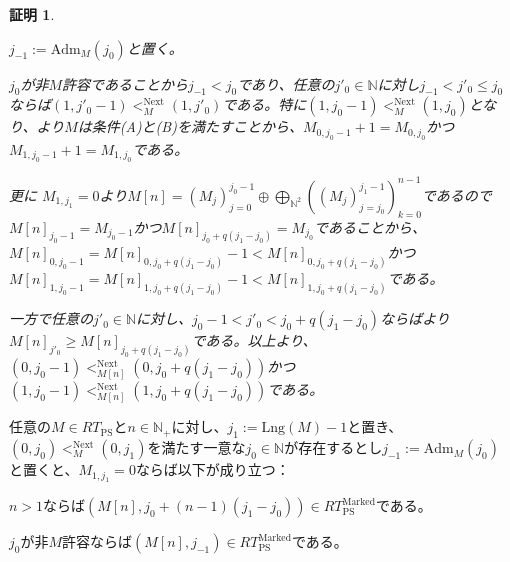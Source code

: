 \documentclass[dvipdfmx,uplatex]{jsarticle}
\theoremstyle{customnonumberbreakfortheorem}
\theoremstyle{customnonumberbreakforproof}
\newtheorem{hideableproof}{証明}
\begin{document}
\begin{hideableproof}
	\begin{indented}
		\item \(j_{-1} := \textrm{Adm}_M(j_0)\)と置く。
		\item \(j_0\)が非\(M\)許容であることから\(j_{-1} < j_0\)であり、任意の\(j'_0 \in \mathbb{N}\)に対し\(j_{-1} < j'_0 \leq j_0\)ならば\((1,j'_0-1) <_M^{\textrm{Next}} (1,j'_0)\)である。特に\((1,j_0-1) <_M^{\textrm{Next}} (1,j_0)\)となり、より\(M\)は条件(A)と(B)を満たすことから、\(M_{0,j_0-1}+1 = M_{0,j_0}\)かつ\(M_{1,j_0-1}+1 = M_{1,j_0}\)である。
		\item 更に \(M_{1,j_1} = 0\)より\(M[n] = (M_j)_{j=0}^{j_0-1} \oplus \bigoplus_{\mathbb{N}^2} ((M_j)_{j=j_0}^{j_1-1})_{k=0}^{n-1}\)であるので\(M[n]_{j_0-1} = M_{j_0-1}\)かつ\(M[n]_{j_0+q(j_1-j_0)} = M_{j_0}\)であることから、\(M[n]_{0,j_0-1} = M[n]_{0,j_0+q(j_1-j_0)}-1 < M[n]_{0,j_0+q(j_1-j_0)}\)かつ\(M[n]_{1,j_0-1} = M[n]_{1,j_0+q(j_1-j_0)}-1 < M[n]_{1,j_0+q(j_1-j_0)}\)である。
		\item 一方で任意の\(j'_0 \in \mathbb{N}\)に対し、\(j_0-1 < j'_0 < j_0+q(j_1-j_0)\)ならばより\(M[n]_{j'_0} \geq M[n]_{j_0+q(j_1-j_0)}\)である。以上より、\((0,j_0-1) <_{M[n]}^{\textrm{Next}} (0,j_0+q(j_1-j_0))\)かつ\((1,j_0-1) <_{M[n]}^{\textrm{Next}} (1,j_0+q(j_1-j_0))\)である。
	\end{indented}
\end{hideableproof}

\begin{lemma}[第\(0\)種型基本列の基本基点関係]\label{第0種型基本列の基本基点関係}
	任意の\(M \in RT_{\textrm{PS}}\)と\(n \in \mathbb{N}_{+}\)に対し、\(j_1 := \textrm{Lng}(M)-1\)と置き、\((0,j_0) <_M^{\textrm{Next}} (0,j_1)\)を満たす一意な\(j_0 \in \mathbb{N}\)が存在するとし\(j_{-1} := \textrm{Adm}_M(j_0)\)と置くと、\(M_{1,j_1} = 0\)ならば以下が成り立つ：
	\begin{penumerate}
		\item \(n > 1\)ならば\((M[n],j_0+(n-1)(j_1-j_0)) \in RT_{\textrm{PS}}^{\textrm{Marked}}\)である。
		\item \(j_0\)が非\(M\)許容ならば\((M[n],j_{-1}) \in RT_{\textrm{PS}}^{\textrm{Marked}}\)である。
	\end{penumerate}
\end{lemma}
\end{document}
